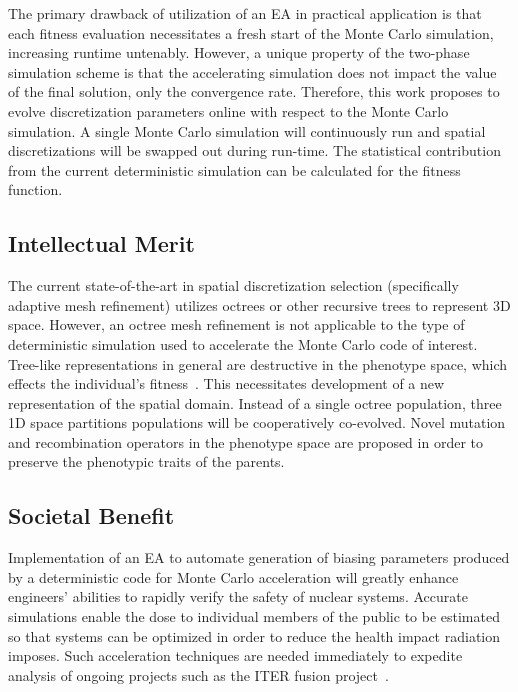 \documentclass{article}
\begin{document}
The primary drawback of utilization of an EA in practical application is that each fitness evaluation necessitates a fresh start of the Monte Carlo simulation, increasing runtime untenably. However, a unique property of the two-phase simulation scheme  is that the accelerating simulation does not impact the value of the final solution, only the convergence rate. Therefore, this work proposes to evolve discretization parameters online with respect to the Monte Carlo simulation. A single Monte Carlo simulation will continuously run and spatial discretizations will be swapped out during run-time. The statistical contribution from the current deterministic simulation can be calculated for the fitness function. 



\subsection{Intellectual Merit}\label{sec:a4}
The current state-of-the-art in spatial discretization selection (specifically adaptive mesh refinement) utilizes octrees or other recursive trees to represent 3D space. However, an octree mesh refinement is not applicable to the type of deterministic simulation used to accelerate the Monte Carlo code of interest. Tree-like representations in general are destructive in the phenotype space, which effects the individual's fitness~\cite{ref:Sheneman2006}. This necessitates development of a new representation of the spatial domain. Instead of a single octree population, three 1D space partitions populations will be cooperatively co-evolved. Novel mutation and recombination operators in the phenotype space are proposed in order to preserve the phenotypic traits of the parents.

\subsection{Societal Benefit}\label{sec:a5}
Implementation of an EA to automate generation of biasing parameters produced by a deterministic code for Monte Carlo acceleration will greatly enhance engineers' abilities to rapidly verify the safety of nuclear systems. Accurate simulations enable the dose to individual members of the public to be estimated so that systems can be optimized in order to reduce the health impact radiation imposes. Such acceleration techniques are needed immediately to expedite analysis of ongoing projects such as the ITER fusion project~\cite{ref:Santoro2008}.
\end{document}
